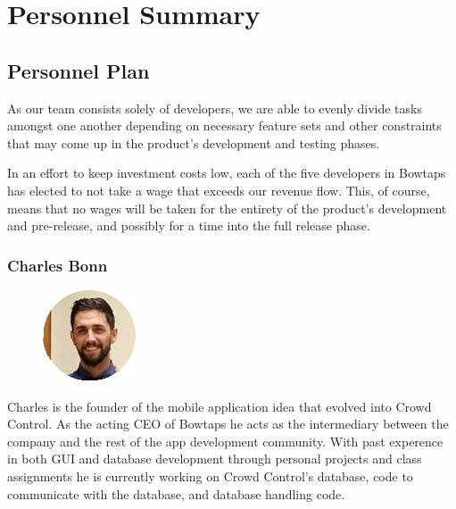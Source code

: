 
\graphicspath{ {Pictures/} }

\chapter{Personnel Summary}

\section{Personnel Plan}

As our team consists solely of developers, we are able to evenly divide tasks amongst one another depending on necessary feature sets and other constraints that may come up in the product’s development and testing phases.

In an effort to keep investment costs low, each of the five developers in Bowtaps has elected to not take a wage that exceeds our revenue flow. This, of course, means that no wages will be taken for the entirety of the product’s development and pre-release, and possibly for a time into the full release phase.\\





\subsection{Charles Bonn}
\begin{minipage}[t]{\linewidth}%
\begin{figure}
\includegraphics{charlesbonn}
\end{figure}

Charles is the founder of the mobile application idea that evolved into Crowd Control. As the acting CEO of Bowtaps he acts as the intermediary between the company and the rest of the app development community.  With past experence in both GUI and database development through personal projects and class assignments he is currently working on Crowd Control's database, code to communicate with the database, and database handling code.
\newline
\newline
\newline
\end{minipage}


